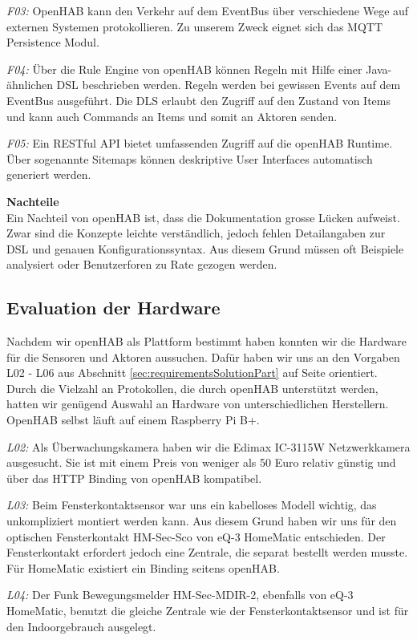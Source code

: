 \textit{F03:} OpenHAB kann den Verkehr auf dem EventBus über verschiedene Wege auf externen Systemen protokollieren. Zu unserem Zweck eignet sich das MQTT Persistence Modul.

\textit{F04:} Über die Rule Engine von openHAB können Regeln mit Hilfe einer Java-ähnlichen DSL beschrieben werden. Regeln werden bei gewissen Events auf dem EventBus ausgeführt. Die DLS erlaubt den Zugriff auf den Zustand von Items und kann auch Commands an Items und somit an Aktoren senden.

\textit{F05:} Ein RESTful API bietet umfassenden Zugriff auf die openHAB Runtime. Über sogenannte Sitemaps können deskriptive User Interfaces automatisch generiert werden.



\textbf{Nachteile} \\
Ein Nachteil von openHAB ist, dass die Dokumentation grosse Lücken aufweist. Zwar sind die Konzepte leichte verständlich, jedoch fehlen Detailangaben zur DSL und genauen Konfigurationssyntax. Aus diesem Grund müssen oft Beispiele analysiert oder Benutzerforen zu Rate gezogen werden.

\subsection{Evaluation der Hardware}
Nachdem wir openHAB als Plattform bestimmt haben konnten wir die Hardware für die Sensoren und Aktoren aussuchen. Dafür haben wir uns an den Vorgaben L02 - L06 aus Abschnitt \ref{sec:requirementsSolutionPart} auf Seite \pageref{sec:requirementsSolutionPart} orientiert. Durch die Vielzahl an Protokollen, die durch openHAB unterstützt werden, hatten wir genügend Auswahl an Hardware von unterschiedlichen Herstellern. OpenHAB selbst läuft auf einem Raspberry Pi B+.

\textit{L02:} Als Überwachungskamera haben wir die Edimax IC-3115W Netzwerkkamera ausgesucht. Sie ist mit einem Preis von weniger als 50 Euro relativ günstig und über das HTTP Binding von openHAB kompatibel.

\textit{L03:} Beim Fensterkontaktsensor war uns ein kabelloses Modell wichtig, das unkompliziert montiert werden kann. Aus diesem Grund haben wir uns für den optischen Fensterkontakt HM-Sec-Sco von eQ-3 HomeMatic entschieden. Der Fensterkontakt erfordert jedoch eine Zentrale, die separat bestellt werden musste. Für HomeMatic existiert ein Binding seitens openHAB.

\textit{L04:} Der Funk Bewegungsmelder HM-Sec-MDIR-2, ebenfalls von eQ-3 HomeMatic, benutzt die gleiche Zentrale wie der Fensterkontaktsensor und ist für den Indoorgebrauch ausgelegt.


